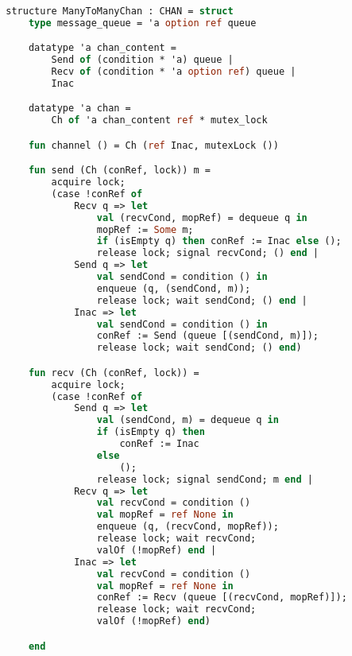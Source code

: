 \documentclass{article}
\begin{document}
    \begin{lstlisting}[language=ML, style=codestyle1]

        structure ManyToManyChan : CHAN = struct
            type message_queue = 'a option ref queue

            datatype 'a chan_content = 
                Send of (condition * 'a) queue | 
                Recv of (condition * 'a option ref) queue | 
                Inac

            datatype 'a chan =
                Ch of 'a chan_content ref * mutex_lock 

            fun channel () = Ch (ref Inac, mutexLock ())

            fun send (Ch (conRef, lock)) m = 
                acquire lock;
                (case !conRef of
                    Recv q => let
                        val (recvCond, mopRef) = dequeue q in
                        mopRef := Some m;
                        if (isEmpty q) then conRef := Inac else (); 
                        release lock; signal recvCond; () end |
                    Send q => let
                        val sendCond = condition () in
                        enqueue (q, (sendCond, m));
                        release lock; wait sendCond; () end |
                    Inac => let
                        val sendCond = condition () in
                        conRef := Send (queue [(sendCond, m)]);
                        release lock; wait sendCond; () end)

            fun recv (Ch (conRef, lock)) =  
                acquire lock;
                (case !conRef of 
                    Send q => let
                        val (sendCond, m) = dequeue q in
                        if (isEmpty q) then
                            conRef := Inac
                        else
                            (); 
                        release lock; signal sendCond; m end |
                    Recv q => let
                        val recvCond = condition ()
                        val mopRef = ref None in
                        enqueue (q, (recvCond, mopRef));
                        release lock; wait recvCond;
                        valOf (!mopRef) end |
                    Inac => let
                        val recvCond = condition ()
                        val mopRef = ref None in
                        conRef := Recv (queue [(recvCond, mopRef)]);
                        release lock; wait recvCond;
                        valOf (!mopRef) end)

            end

        \end{lstlisting}
\end{document}
